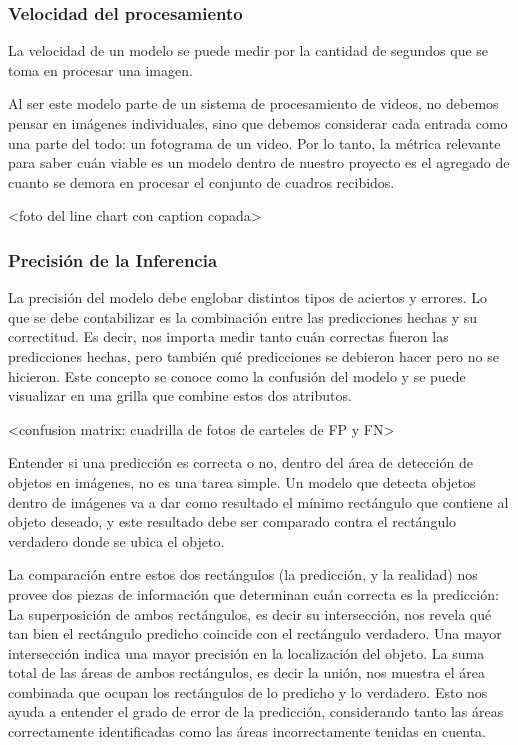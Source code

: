 \documentclass[a4paper]{article}
\begin{document}
\subsubsection{Velocidad del procesamiento}

La velocidad de un modelo se puede medir por la cantidad de segundos que se toma en procesar una imagen.

Al ser este modelo parte de un sistema de procesamiento de videos, no debemos pensar en imágenes individuales, sino que debemos considerar cada entrada como una parte del todo: un fotograma de un video. Por lo tanto, la métrica relevante para saber cuán viable es un modelo dentro de nuestro proyecto es el agregado de cuanto se demora en procesar el conjunto de cuadros recibidos.

<foto del line chart con caption copada>

\subsubsection{Precisión de la Inferencia}

La precisión del modelo debe englobar distintos tipos de aciertos y errores. Lo que se debe contabilizar es la combinación entre las predicciones hechas y su correctitud. Es decir, nos importa medir tanto cuán correctas fueron las predicciones hechas, pero también qué predicciones se debieron hacer pero no se hicieron. Este concepto se conoce como la confusión del modelo y se puede visualizar en una grilla que combine estos dos atributos.

<confusion matrix: cuadrilla de fotos de carteles de FP y FN>

Entender si una predicción es correcta o no, dentro del área de detección de objetos en imágenes, no es una tarea simple. Un modelo que detecta objetos dentro de imágenes va a dar como resultado el mínimo rectángulo que contiene al objeto deseado, y este resultado debe ser comparado contra el rectángulo verdadero donde se ubica el objeto.

La comparación entre estos dos rectángulos (la predicción, y la realidad) nos provee dos piezas de información que determinan cuán correcta es la predicción:
La superposición de ambos rectángulos, es decir su intersección, nos revela qué tan bien el rectángulo predicho coincide con el rectángulo verdadero. Una mayor intersección indica una mayor precisión en la localización del objeto.
La suma total de las áreas de ambos rectángulos, es decir la unión, nos muestra el área combinada que ocupan los rectángulos de lo predicho y lo verdadero. Esto nos ayuda a entender el grado de error de la predicción, considerando tanto las áreas correctamente identificadas como las áreas incorrectamente tenidas en cuenta.
\end{document}
